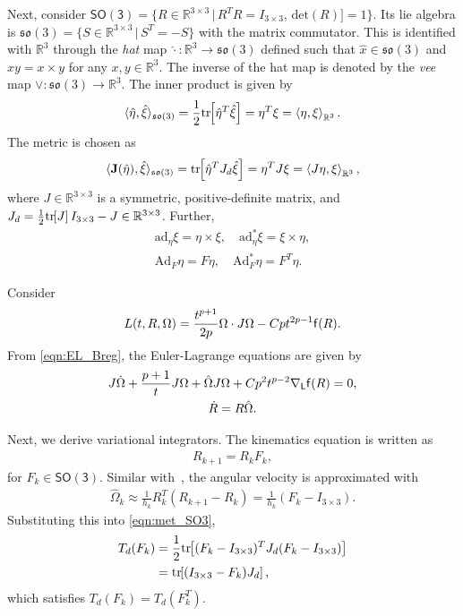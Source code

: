 \documentclass[letterpaper, 10pt, conference]{ieeeconf}
\newcommand{\bracket}[1]{\ensuremath{\left[ #1 \right]}}
\newcommand{\tr}[1]{\mbox{tr}\ensuremath{\negthickspace\bracket{#1}}}
\newcommand{\SO}{\ensuremath{\mathsf{SO(3)}}}
\renewcommand{\L}{\ensuremath{\mathsf{L}}}
\newcommand{\so}{\ensuremath{\mathfrak{so}(3)}}
\renewcommand{\Re}{\ensuremath{\mathbb{R}}}
\newcommand{\pair}[1]{\ensuremath{\left\langle #1 \right\rangle}}
\newcommand{\Ad}{\ensuremath{\mathrm{Ad}}}
\newcommand{\ad}{\ensuremath{\mathrm{ad}}}
\begin{document}
Next, consider $\SO=\{R\in\Re^{3\times 3}\,|\, R^T R = I_{3\times 3},\, \mathrm{det}(R)]=1\}$.
Its lie algebra is $\so=\{S\in\Re^{3\times 3}\,|\, S^T=-S\}$ with the matrix commutator. 
This is identified with $\Re^3$ through the \textit{hat} map $\hat\cdot :\Re^3\rightarrow\so$ defined such that $\hat x\in\so$ and $\hat x y = x\times y$ for any $x,y\in\Re^3$.
The inverse of the hat map is denoted by the \textit{vee} map $\vee: \so\rightarrow\Re^3$.
The inner product is given by
\begin{align*}
    \langle \hat \eta, \hat \xi \rangle_{\so} = \frac{1}{2}\tr{\hat \eta^T\hat \xi} = \eta^T\xi = \pair{\eta,\xi}_{\Re^3}.
\end{align*}
The metric is chosen as
\begin{align}
    \langle \mathbf{J}(\hat \eta), \hat \xi \rangle_{\so} = \tr{\hat \eta^T J_d \hat \xi} = \eta^TJ \xi = \pair{J\eta,\xi}_{\Re^3},\label{eqn:met_SO3}
\end{align}
where $J\in\Re^{3\times 3}$ is a symmetric, positive-definite matrix, and $J_d=\frac{1}{2}\tr{J}I_{3\times 3}-J\in\Re^{3\times 3}$.
Further, 
\begin{align*}
    \ad_\eta\xi = \eta\times \xi, \quad \ad^*_\eta \xi = \xi\times \eta,\\
    \Ad_F\eta = F\eta, \quad \Ad^*_F \eta = F^T\eta.
\end{align*}

Consider
\begin{align*}
    L(t,R,\Omega) = \frac{t^{p+1}}{2p} \Omega\cdot J\Omega - Cpt^{2p-1} \mathsf{f}(R).
\end{align*}
From \eqref{eqn:EL_Breg}, the Euler-Lagrange equations are given by
\begin{gather}
    J\dot\Omega + \frac{p+1}{t} J\Omega + \hat\Omega J\Omega + C p^2 t^{p-2} \nabla_\L \obj(R) = 0,\label{eqn:EL_SO3}\\
    \dot R = R\hat\Omega. \label{eqn:R_dot}
\end{gather}

Next, we derive variational integrators. 
The kinematics equation is written as
\begin{align}
    R_{k+1} = R_k F_k, \label{eqn:Rkp}
\end{align}
for $F_k\in\SO$.
Similar with~\cite{LeeLeoCMAME07}, the angular velocity is approximated with
\begin{align*}
    \hat\Omega_k \approx \frac{1}{h_k} R_k^T (R_{k+1}-R_k) = \frac{1}{h_k} (F_k-I_{3\times 3}).
\end{align*}
Substituting this into \eqref{eqn:met_SO3},
\begin{align}
    T_d(F_k) & = \frac{1}{2}\tr{(F_k-I_{3\times 3})^T J_d(F_k-I_{3\times 3})}\nonumber \\
             & =\tr{(I_{3\times 3}-F_k)J_d}, \label{eqn:Td_SO3}
\end{align}
which satisfies $T_d(F_k)=T_d(F_k^T)$.
\end{document}
